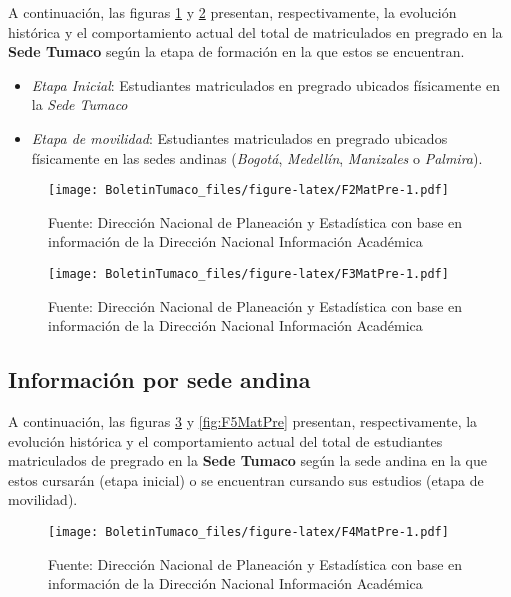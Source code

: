 \documentclass[
]{book}
\begin{document}
A continuación, las figuras \ref{fig:F2MatPre} y \ref{fig:F3MatPre} presentan, respectivamente, la evolución histórica y el comportamiento actual del total de matriculados en pregrado en la \textbf{Sede Tumaco} según la etapa de formación en la que estos se encuentran.

\begin{itemize}
\item
  \emph{Etapa Inicial}: Estudiantes matriculados en pregrado ubicados físicamente en la \emph{Sede Tumaco}
\item
  \emph{Etapa de movilidad}: Estudiantes matriculados en pregrado ubicados físicamente en las sedes andinas (\emph{Bogotá}, \emph{Medellín}, \emph{Manizales} o \emph{Palmira}).
\end{itemize}

\begin{figure}
\centering
\texttt{[image: BoletinTumaco\_files/figure-latex/F2MatPre-1.pdf]}
\caption{\label{fig:F2MatPre}Fuente: Dirección Nacional de Planeación y Estadística con base en información de la Dirección Nacional Información Académica}
\end{figure}

\begin{figure}
\centering
\texttt{[image: BoletinTumaco\_files/figure-latex/F3MatPre-1.pdf]}
\caption{\label{fig:F3MatPre}Fuente: Dirección Nacional de Planeación y Estadística con base en información de la Dirección Nacional Información Académica}
\end{figure}

\hypertarget{informaciuxf3n-por-sede-andina}{%
\subsection{Información por sede andina}\label{informaciuxf3n-por-sede-andina}}

A continuación, las figuras \ref{fig:F4MatPre} y \ref{fig:F5MatPre} presentan, respectivamente, la evolución histórica y el comportamiento actual del total de estudiantes matriculados de pregrado en la \textbf{Sede Tumaco} según la sede andina en la que estos cursarán (etapa inicial) o se encuentran cursando sus estudios (etapa de movilidad).

\begin{figure}
\centering
\texttt{[image: BoletinTumaco\_files/figure-latex/F4MatPre-1.pdf]}
\caption{\label{fig:F4MatPre}Fuente: Dirección Nacional de Planeación y Estadística con base en información de la Dirección Nacional Información Académica}
\end{figure}
\end{document}

